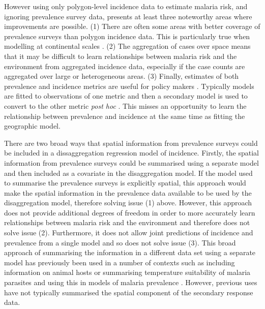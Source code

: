\documentclass{statsoc}
\begin{document}
However using only polygon-level incidence data to estimate malaria risk, and ignoring prevalence survey data, presents at least three noteworthy areas where improvements are possible. 
(1) There are often some areas with better coverage of prevalence surveys than polygon incidence data. This is particularly true when modelling at continental scales \citep{weiss2019mapping, battle2019mapping}.
(2) The aggregation of cases over space means that it may be difficult to learn relationships between malaria risk and the environment from aggregated incidence data, especially if the case counts are aggregated over large or heterogeneous areas.
(3) Finally, estimates of both prevalence and incidence metrics are useful for policy makers \citep{cohen2017mapping}. Typically models are fitted to observations of one metric and then a secondary model is used to convert to the other metric \emph{post hoc} \citep{battle2019mapping, bhatt2015effect}. This misses an opportunity to learn the relationship between prevalence and incidence at the same time as fitting the geographic model.

There are two broad ways that spatial information from prevalence surveys could be included in a dissaggregation regression model of incidence.
Firstly, the spatial information from prevalence surveys could be summarised using a separate model and then included as a covariate in the disaggregation model.
If the model used to summarise the prevalence surveys is explicitly spatial, this approach would make the spatial information in the prevalence data available to be used by the disaggregation model, therefore solving issue (1) above.
However, this approach does not provide additional degrees of freedom in order to more accurately learn relationships between malaria risk and the environment and therefore does not solve issue (2).
Furthermore, it does not allow joint predictions of incidence and prevalence from a single model and so does not solve issue (3).
This broad approach of summarising the information in a different data set using a separate model has previously been used in a number of contexts such as including information on animal hosts \citep{shearer2016estimating} or summarising temperature suitability of malaria parasites \citep{weiss2014air} and using this in models of malaria prevalence \citep{bhatt2015effect, weiss2019mapping}.
However, previous uses have not typically summarised the spatial component of the secondary response data.
\end{document}
